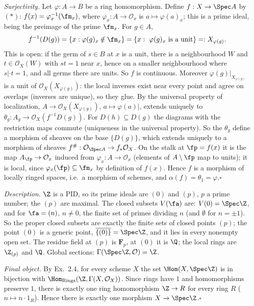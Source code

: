 \documentclass[11pt]{article}
\begin{document}
\emph{Surjectivity.} Let $\varphi:A\to B$ be a ring homomorphism. Define $f:X\to\Spec A$ by $(*)$: $f(x)=\varphi_x^{-1}(\fm_x)$, where $\varphi_x:A\to\mathcal O_x$ is $a\mapsto\varphi(a)_x$; this is a prime ideal, being the preimage of the prime $\fm_x$. For $g\in A$,
\[f^{-1}(D(g))=\{x:\varphi(g)_x\notin\fm_x\}=\{x:\ \varphi(g)_x\ \text{is a unit}\}=:X_{\varphi(g)}.\]
This is open: if the germ of $s\in B$ at $x$ is a unit, there is a neighbourhood $W$ and $t\in\mathcal O_X(W)$ with $st=1$ near $x$, hence on a smaller neighbourhood where $s|\cdot t=1$, and all germs there are units. So $f$ is continuous. Moreover $\varphi(g)|_{X_{\varphi(g)}}$ is a unit of $\mathcal O_X(X_{\varphi(g)})$: the local inverses exist near every point and agree on overlaps (inverses are unique), so they glue. By the universal property of localization, $A\to\mathcal O_X(X_{\varphi(g)})$, $a\mapsto\varphi(a)|$, extends uniquely to $\theta_g:A_g\to\mathcal O_X(f^{-1}D(g))$. For $D(h)\subseteq D(g)$ the diagrams with the restriction maps commute (uniqueness in the universal property). So the $\theta_g$ define a morphism of sheaves on the base $\{D(g)\}$, which extends uniquely to a morphism of sheaves $f^\#:\mathcal O_{\Spec A}\to f_*\mathcal O_X$. On the stalk at $\fp=f(x)$ it is the map $A_\fp\to\mathcal O_x$ induced from $\varphi_x:A\to\mathcal O_x$ (elements of $A\setminus\fp$ map to units); it is local, since $\varphi_x(\fp)\subseteq\fm_x$ by definition of $f(x)$. Hence $f$ is a morphism of locally ringed spaces, i.e.\ a morphism of schemes, and $\alpha(f)=\theta_1=\varphi$.\hfill$\square$

\pf
\emph{Description.} $\Z$ is a PID, so its prime ideals are $(0)$ and $(p)$, $p$ a prime number; the $(p)$ are maximal. The closed subsets $V(\fa)$ are: $V(0)=\Spec\Z$, and for $\fa=(n)$, $n\ne0$, the finite set of primes dividing $n$ (and $\emptyset$ for $n=\pm1$). So the proper closed subsets are exactly the finite sets of closed points $(p)$; the point $(0)$ is a generic point, $\overline{\{(0)\}}=\Spec\Z$, and it lies in every nonempty open set. The residue field at $(p)$ is $\mathbf F_p$, at $(0)$ it is $\Q$; the local rings are $\Z_{(p)}$ and $\Q$. Global sections: $\Gamma(\Spec\Z,\mathcal O)=\Z$.

\emph{Final object.} By Ex.~2.4, for every scheme $X$ the set $\Hom(X,\Spec\Z)$ is in bijection with $\Hom_{\mathrm{Rings}}(\Z,\Gamma(X,\mathcal O_X))$. Since rings have $1$ and homomorphisms preserve $1$, there is exactly one ring homomorphism $\Z\to R$ for every ring $R$ ($n\mapsto n\cdot1_R$). Hence there is exactly one morphism $X\to\Spec\Z$.\hfill$\square$
\end{document}
